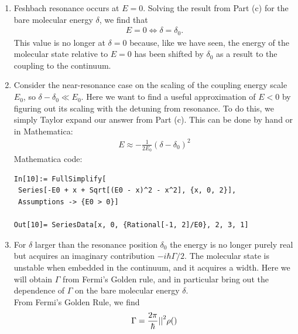 \documentclass{article}
\theoremstyle{definition}
\newcommand{\f}[2]{\frac{#1}{#2}}
\begin{document}
\begin{enumerate}[label=(\alph*)]
\begin{lstlisting}
energies = figure(1);
for d = delta
    H0 = diag(-1:1:dim-2);
    H0(1,1) = d;
    H = H0 + V;
    e = eig(H);
    hold on 
    plot(d*ones(dim), e, 'o', 'Color', 'red', 'MarkerSize', 2);
    plot(d,d)
end
for i=0:1:dim
    yline(i, '--', 'Color', 'black')
end
xline(0, '--', 'Color','black')
xline(6, '--', 'Color','black')
plot(delta, delta, "--",'Color', 'blue')
ylim([-4, 6])
hold off 
set(gca,'xtick', [0,6]);
xticklabels({'0','\delta_0'})
set(gca,'ytick', 0);
xlabel('Detuning \delta', 'FontSize',13)
ylabel('Two-particle energy', 'FontSize',13)
xm = [0.2 0.24];
ym = [0.3 0.25];
annotation('textarrow',xm,ym,'String','|m>')
xp = [0.5 0.5];
yp = [0.3 0.4];
annotation('textarrow',xp,yp,'String','|\phi>')
xk = [0.85 0.85];
yk = [0.65 0.75];
annotation('textarrow',xk,yk,'String','|k>')
\end{lstlisting}


\item Feshbach resonance occurs at $E=0$. Solving the result from Part (c) for the bare molecular energy $\delta$, we find that
\begin{align*}
E = 0 \iff \delta = \delta_0.
\end{align*}
This value is no longer at $\delta = 0$ because, like we have seen, the energy of the molecular state relative to $E=0$ has been shifted by $\delta_0$ as a result to the coupling to the continuum. 


\item Consider the near-resonance case on the scaling of the coupling energy scale $E_0$, so $\delta - \delta_0 \ll E_0$. Here we want to find a useful approximation of $E <0$ by figuring out its scaling with the detuning from resonance. To do this, we simply Taylor expand our answer from Part (c). This can be done by hand or in Mathematica:
\begin{align*}
 E \approx -\f{1}{2E_0}(\delta - \delta_0)^2
\end{align*}
Mathematica code:
\begin{lstlisting}
In[10]:= FullSimplify[
 Series[-E0 + x + Sqrt[(E0 - x)^2 - x^2], {x, 0, 2}], 
 Assumptions -> {E0 > 0}]

Out[10]= SeriesData[x, 0, {Rational[-1, 2]/E0}, 2, 3, 1]
\end{lstlisting}


\item For $\delta$ larger than the resonance position $\delta_0$ the energy  is no longer purely real but acquires an imaginary contribution $-i\hbar \Gamma/2$. The molecular state is unstable when embedded in the
continuum, and it acquires a width. Here we will obtain $\Gamma$ from Fermi’s Golden rule, and in particular
bring out the dependence of $\Gamma$ on the bare molecular energy $\delta$. \\

\noindent From Fermi's Golden Rule, we find 
\begin{align*}
\Gamma = \f{2\pi}{\hbar}  \abs{     }^2 \rho()
\end{align*}

\end{enumerate}
\end{document}
